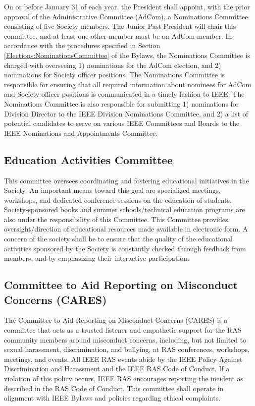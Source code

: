 \documentclass[10pt]{article}
\newcommand{\secref}[1]{Section \ref{#1}}
\begin{document}
On or before January 31 of each year, the President shall appoint, with the prior approval of the Administrative Committee (AdCom), a Nominations Committee consisting of five Society members. The Junior Past-President will chair this committee, and at least one other member must be an AdCom member. In accordance with the procedures specified in \secref{Elections:NominationsCommittee} of the Bylaws, the Nominations Committee is charged with overseeing 1) nominations for the AdCom election, and 2) nominations for Society officer positions. The Nominations Committee is responsible for ensuring that all required information about nominees for AdCom and Society officer positions is communicated in a timely fashion to IEEE. The Nominations Committee is also responsible for submitting 1) nominations for Division Director to the IEEE Division Nominations Committee, and 2) a list of potential candidates to serve on various IEEE Committees and Boards to the IEEE Nominations and Appointments Committee.

\subsection{Education Activities Committee}

This committee oversees coordinating and fostering educational initiatives in the Society.  An important means toward this goal are specialized meetings, workshops, and dedicated conference sessions on the education of students. Society-sponsored books and summer schools/technical education programs are also under the responsibility of this Committee. This Committee provides oversight/direction of educational resources made available in electronic form. A concern of the society shall be to ensure that the quality of the educational activities sponsored by the Society is constantly checked through feedback from members, and by emphasizing their interactive participation.

\subsection{Committee to Aid Reporting on Misconduct Concerns (CARES)}

The Committee to Aid Reporting on Misconduct Concerns (CARES) is a committee that acts as a trusted listener and empathetic support for the RAS community members around misconduct concerns, including, but not limited to sexual harassment, discrimination, and bullying, at RAS conferences, workshops, meetings, and events. All IEEE RAS events abide by the IEEE Policy Against Discrimination and Harassment and the IEEE RAS Code of Conduct. If a violation of this policy occurs, IEEE RAS encourages reporting the incident as described in the RAS Code of Conduct. This committee shall operate in alignment with IEEE Bylaws and policies regarding ethical complaints.
\end{document}
